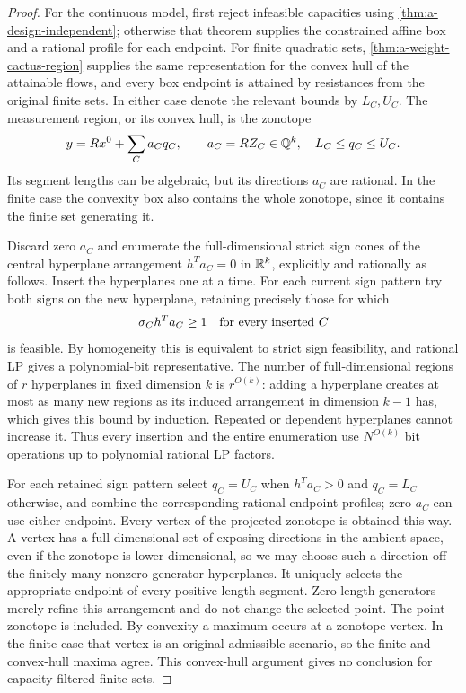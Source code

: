 \begin{proof}
For the continuous model, first reject infeasible capacities using
\cref{thm:a-design-independent}; otherwise that theorem supplies
the constrained affine box and a rational profile for each endpoint.
For finite quadratic sets, \cref{thm:a-weight-cactus-region} supplies
the same representation for the convex hull of the attainable flows,
and every box endpoint is attained by resistances from the
original finite sets.  In either case denote the relevant bounds
by $L_C,U_C$.  The measurement region, or its convex hull, is the
zonotope
\[
 y=Rx^0+\sum_C a_Cq_C,\qquad
 a_C=RZ_C\in\mathbb{Q}^k,\quad L_C\le q_C\le U_C.
\]
Its segment lengths can be algebraic, but its directions $a_C$ are
rational.  In the finite case the convexity box also contains the whole
zonotope, since it contains the finite set generating it.

Discard zero $a_C$ and enumerate the full-dimensional strict sign
cones of the central hyperplane arrangement $h^Ta_C=0$ in $\mathbb{R}^k$,
explicitly and rationally as follows.  Insert the hyperplanes
one at a time.  For each current sign pattern try both signs on the
new hyperplane, retaining precisely those for which
\[
 \sigma_C h^Ta_C\ge1\quad\hbox{for every inserted }C
\]
is feasible.  By homogeneity this is equivalent to strict sign
feasibility, and rational LP gives a polynomial-bit representative.
The number of full-dimensional regions of $r$ hyperplanes in fixed
dimension $k$ is $r^{O(k)}$: adding a hyperplane creates at most as many
new regions as its induced arrangement in dimension $k-1$ has, which
gives this bound by induction.  Repeated or dependent hyperplanes
cannot increase it.  Thus every insertion and the entire enumeration
use $N^{O(k)}$ bit operations up to polynomial rational LP factors.

For each retained sign pattern select $q_C=U_C$ when $h^Ta_C>0$
and $q_C=L_C$ otherwise, and combine the corresponding rational
endpoint profiles; zero $a_C$ can use either endpoint.  Every
vertex of the projected zonotope is obtained this way.  A vertex
has a full-dimensional set of exposing directions in the ambient
space, even if the zonotope is lower dimensional, so we may choose such
a direction off the finitely many nonzero-generator hyperplanes.
It uniquely selects the appropriate endpoint of every positive-length
segment.  Zero-length generators merely refine this arrangement and
do not change the selected point.  The point zonotope is included.
By convexity a maximum occurs at a zonotope vertex.  In the finite case
that vertex is an original admissible scenario, so the finite and
convex-hull maxima agree.  This convex-hull argument gives no conclusion
for capacity-filtered finite sets.


\end{proof}
